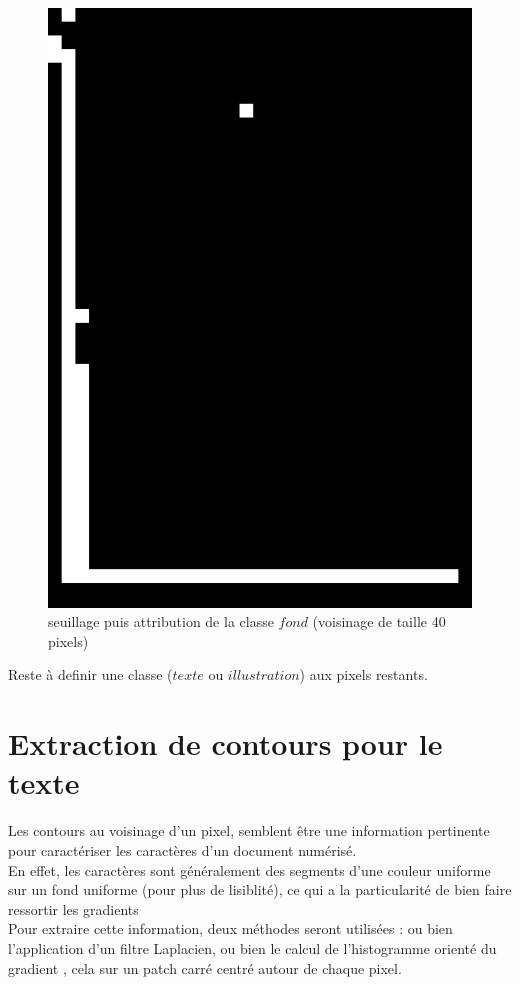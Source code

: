 \documentclass{book}
\begin{document}
\begin{figure}[H]
\begin{center}
\includegraphics[scale=0.075]{images/1g_seuil.jpg}
\end{center}
\caption{seuillage puis attribution de la classe $fond$ (voisinage de taille 40 pixels)}
\label{classe_fond}
\end{figure}

Reste à definir une classe ($texte$ ou $illustration$) aux pixels restants.

\section{Extraction de contours pour le texte}

Les contours au voisinage d'un pixel, semblent être une information pertinente pour caractériser les caractères d'un document numérisé.\\
En effet, les caractères sont généralement des segments d'une couleur uniforme sur un fond uniforme (pour plus de lisiblité), ce qui a la 
particularité de bien faire ressortir les gradients\\
Pour extraire cette information, deux méthodes seront utilisées : ou bien l'application d'un filtre Laplacien, ou bien le calcul de l'histogramme orienté du gradient 
\cite{Dalal05histogramsof}, cela sur un patch carré centré autour de chaque pixel. 
\end{document}
